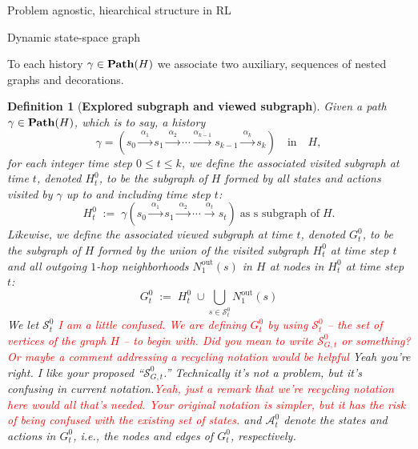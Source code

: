 \documentclass[11pt]{article}
\newtheorem{definition}[subsubsection]{Definition}
\begin{document}
\begin{section}{Problem agnostic, hiearchical structure in RL}

\begin{subsection}{Dynamic state-space graph}

To each history $\gamma\in\bold{Path}(H)$ we associate two auxiliary, sequences of nested graphs and decorations.

\begin{definition}[{\bf Explored subgraph and viewed subgraph}]
\normalfont
Given a path $\gamma\in\bold{Path}(H)$, which is to say, a history
\begin{equation}\label{eq: gamma history}
\gamma=\left(s_{0}\xrightarrow{\ \alpha_{1}\ }s_{1}\xrightarrow{\ \alpha_{2}\ }\cdots\xrightarrow{\alpha_{k-1}}s_{k-1}\xrightarrow{\ \alpha_{k}\ }s_{k}\right)\quad\text{in}\quad H,
\end{equation}
for each integer time step $0\le t\le k$, we define the associated {\em visited subgraph at time $t$}, denoted $H^{0}_{t}$, to be the subgraph of $H$ formed by all states and actions visited by $\gamma$ up to and including time step $t$:
$$
H^{0}_{t}\;:=\;\gamma\left(s_{0}\xrightarrow{\ \alpha_{1}\ }s_{1}\xrightarrow{\ \alpha_{2}\ }\cdots\xrightarrow{\ \alpha_{t}\ }s_{t}\right)\;\text{as s subgraph of}\;H.
$$
Likewise, we define the associated {\em viewed subgraph at time $t$}, denoted $G^{0}_{t}$, to be the subgraph of $H$ formed by the union of the visited subgraph $H^{0}_{t}$ at time step $t$ and all outgoing $1$-hop neighborhoods $N^{\text{out}\!}_{1}(s)$ in $H$ at nodes in $H^{0}_{t}$ at time step $t$:
$$
G^{0}_{t}
\;:=\;
H^{0}_{t}\;\cup\bigcup_{s\in \mathcal{S}^{0}_{t}}
\!\!N^{\text{out}\!}_{1}(s)
$$
We let $\mathcal{S}^{0}_{t}$ \textcolor{red}{I am a little confused. We are defining $G^0_t$ by using $\mathcal{S}^0_t$ -- the set of vertices of the graph $H$ -- to begin with. Did you mean to write $\mathcal{S}^0_{G,t}$ or something? Or maybe a comment addressing a recycling notation would be helpful} {\color{blue} Yeah you're right. I like your proposed ``$\mathcal{S}^{0}_{G,t}$.'' Technically it's not a problem, but it's confusing in current notation.}\textcolor{red}{Yeah, just a remark that we're recycling notation here would all that's needed. Your original notation is simpler, but it has the risk of being confused with the existing set of states.} and $\mathcal{A}^{0}_{t}$ denote the states and actions in $G^{0}_{t}$, i.e., the nodes and edges of $G^{0}_{t}$, respectively.
\end{definition}

\end{subsection}
\end{section}
\end{document}
